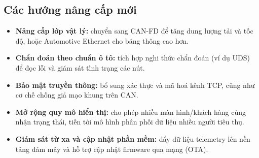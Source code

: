 \documentclass[../DoAn.tex]{subfiles}
\begin{document}
\subsection*{Các hướng nâng cấp mới}
\begin{itemize}
  \item \textbf{Nâng cấp lớp vật lý:} chuyển sang CAN-FD để tăng dung lượng tải
    và tốc độ, hoặc Automotive Ethernet cho băng thông cao hơn.
  \item \textbf{Chẩn đoán theo chuẩn ô tô:} tích hợp nghi thức chẩn đoán (ví dụ
    UDS) để đọc lỗi và giám sát tình trạng các nút.
  \item \textbf{Bảo mật truyền thông:} bổ sung xác thực và mã hoá kênh TCP, cũng
    như cơ chế chống giả mạo khung trên CAN.
  \item \textbf{Mở rộng quy mô hiển thị:} cho phép nhiều màn hình/khách hàng cùng
    nhận trạng thái, tiến tới mô hình phân phối dữ liệu nhiều người tiêu thụ.
  \item \textbf{Giám sát từ xa và cập nhật phần mềm:} đẩy dữ liệu telemetry lên
    nền tảng đám mây và hỗ trợ cập nhật firmware qua mạng (OTA).
\end{itemize}
\end{document}
